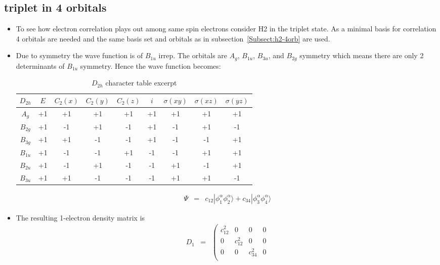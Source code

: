 \documentclass[aip,graphicx]{revtex4-1}
\begin{document}
\subsection{triplet  in 4 orbitals}
\label{3h2}

\begin{itemize}
\item To see how electron correlation plays out among same spin electrons consider H2 in 
         the triplet state. As a minimal basis for correlation 4 orbitals are needed and the same
         basis set and orbitals as in subsection~\ref{Subsect:h2-4orb} are used.
\item Due to symmetry the wave function is of $B_{1u}$ irrep. The orbitals are $A_g$, $B_{1u}$, $B_{3u}$, and $B_{2g}$ symmetry
         which means there are only 2 determinants of $B_{1u}$ symmetry. Hence the wave function becomes:
         \begin{table}
         \begin{tabular}{ccccccccc}
         $D_{2h}$ & $E$ & $C_2(x)$ & $C_2(y)$ & $C_2(z)$ & $i$ & $\sigma(xy)$ & $\sigma(xz)$ & $\sigma(yz)$ \\
         \hline
         $A_g$     & +1 & +1 & +1 & +1 & +1 & +1 & +1 & +1 \\
         $B_{2g}$  & +1 & -1 & +1 & -1 & +1 & -1 & +1 & -1 \\
         $B_{3g}$  & +1 & +1 & -1 & -1 & +1 & -1 & -1 & +1 \\
         $B_{1u}$  & +1 & -1 & -1 & +1 & -1 & -1 & +1 & +1 \\
         $B_{2u}$  & +1 & -1 & +1 & -1 & -1 & +1 & -1 & +1 \\
         $B_{3u}$  & +1 & +1 & -1 & -1 & -1 & +1 & +1 & -1 
         \end{tabular}
         \caption{$D_{2h}$ character table excerpt}
         \end{table}
         \begin{eqnarray}
         \Psi &=& c_{12}|\phi^\alpha_1\phi^\alpha_2\rangle + c_{34}|\phi^\alpha_3\phi^\alpha_4\rangle 
        \end{eqnarray}
\item The resulting 1-electron density matrix is
         \begin{eqnarray}
         D_{1} &=&
         \left(\begin{matrix}
         c_{12}^2 & 0 & 0 & 0 \\
         0 & c_{12}^2 & 0 & 0 \\
         0 & 0 & c_{34}^2 & 0 \\

\end{matrix}
\end{eqnarray}
\end{itemize}
\end{document}
